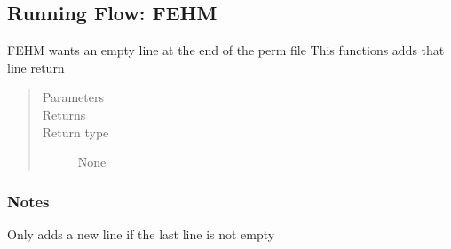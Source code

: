 \documentclass[letterpaper,10pt,english]{sphinxmanual}
\begin{document}
\subsection{Running Flow: FEHM}
\label{\detokenize{pydfnworks:module-pydfnworks.dfnFlow.fehm}}\label{\detokenize{pydfnworks:running-flow-fehm}}

\begin{fulllineitems}
\label{\detokenize{pydfnworks:pydfnworks.dfnFlow.fehm.correct_perm_for_fehm}}
FEHM wants an empty line at the end of the perm file
This functions adds that line return
\begin{quote}\begin{description}
\item[{Parameters}] \leavevmode
{} \textendash{} 

\item[{Returns}] \leavevmode


\item[{Return type}] \leavevmode
None

\end{description}\end{quote}
\subsubsection*{Notes}

Only adds a new line if the last line is not empty

\end{fulllineitems}

\end{document}
